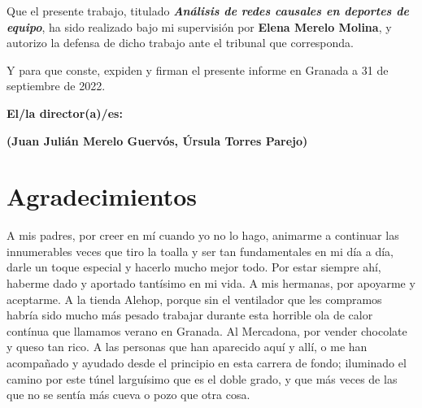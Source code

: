 Que el presente trabajo, titulado \textit{\textbf{Análisis de redes causales en deportes de equipo}},
ha sido realizado bajo mi supervisión por \textbf{Elena Merelo Molina}, y autorizo la defensa de dicho 
trabajo ante el tribunal que corresponda.

\vspace{0.5cm}

Y para que conste, expiden y firman el presente informe en Granada a 31 de septiembre de 2022.

\vspace{1cm}

\textbf{El/la director(a)/es: }

\vspace{5cm}

\noindent \textbf{(Juan Julián Merelo Guervós, Úrsula Torres Parejo)}

\chapter*{Agradecimientos}

A mis padres, por creer en mí cuando yo no lo hago, animarme a continuar las innumerables veces que tiro la 
toalla y ser tan fundamentales en mi día a día, darle un toque especial y hacerlo mucho mejor todo. Por estar 
siempre ahí, haberme dado y aportado tantísimo en mi vida. A mis hermanas, por apoyarme y aceptarme. A la 
tienda Alehop, porque sin el ventilador que les compramos habría sido mucho más pesado trabajar durante 
esta horrible ola de calor contínua que llamamos verano en Granada. Al Mercadona, por vender chocolate y 
queso tan rico. A las personas que han aparecido aquí y allí, o me han acompañado y ayudado desde el principio 
en esta carrera de fondo; iluminado el camino por este túnel larguísimo que es el doble grado, y que más 
veces de las que no se sentía más cueva o pozo que otra cosa. 


